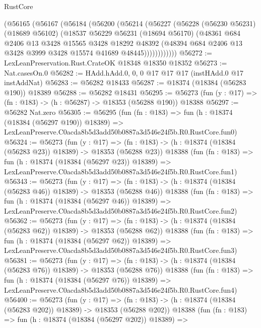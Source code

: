 \begin{lexlean}{RustCore}
\begin{coremodule}
        (@56165
          (@56167
            (@56184
              (@56200
                (@56214
                  (@56227
                    (@56228
                      (@56230 @56231)
                      (@18689 @56102)
                      (@18537
                        @56229
                        @56231
                        (@18694 @56170)
                        (@48361
                          @684
                          @2406
                          @13
                          @3428
                          @15565
                          @3428
                          @18292
                          @48392
                          (@48394 @684 @2406 @13 @3428 @3999 @3428 @15574 @41689 @48445))))))))))))
@56272 := LexLeanPreservation.Rust.CrateOK @18348 @18350 @18352
@56273 := Nat.casesOn.{0}
@56282 := HAdd.hAdd.{0, 0, 0} @17 @17 @17 (instHAdd.{0} @17 instAddNat)
@56283 := @56282 @18433
@56287 := @18374 (@18384 (@56283 @190)) @18389
@56288 := @56282 @18431
@56295 := @56273 (fun (y : @17) => (fn : @183) -> (h : @56287) -> @18353 (@56288 @190)) @18388
@56297 := @56282 Nat.zero
@56305 := @56295
    (fun (fn : @183) =>
    fun (h : @18374 (@18384 (@56297 @190)) @18389) =>
    LexLeanPreserve.C0acda8b5d3add50b0887a3d546e24f5b.R0.RustCore.fun0)
@56324 := @56273
    (fun (y : @17) =>
    (fn : @183) -> (h : @18374 (@18384 (@56283 @23)) @18389) -> @18353 (@56288 @23))
    @18388
    (fun (fn : @183) =>
    fun (h : @18374 (@18384 (@56297 @23)) @18389) =>
    LexLeanPreserve.C0acda8b5d3add50b0887a3d546e24f5b.R0.RustCore.fun1)
@56343 := @56273
    (fun (y : @17) =>
    (fn : @183) -> (h : @18374 (@18384 (@56283 @46)) @18389) -> @18353 (@56288 @46))
    @18388
    (fun (fn : @183) =>
    fun (h : @18374 (@18384 (@56297 @46)) @18389) =>
    LexLeanPreserve.C0acda8b5d3add50b0887a3d546e24f5b.R0.RustCore.fun2)
@56362 := @56273
    (fun (y : @17) =>
    (fn : @183) -> (h : @18374 (@18384 (@56283 @62)) @18389) -> @18353 (@56288 @62))
    @18388
    (fun (fn : @183) =>
    fun (h : @18374 (@18384 (@56297 @62)) @18389) =>
    LexLeanPreserve.C0acda8b5d3add50b0887a3d546e24f5b.R0.RustCore.fun3)
@56381 := @56273
    (fun (y : @17) =>
    (fn : @183) -> (h : @18374 (@18384 (@56283 @76)) @18389) -> @18353 (@56288 @76))
    @18388
    (fun (fn : @183) =>
    fun (h : @18374 (@18384 (@56297 @76)) @18389) =>
    LexLeanPreserve.C0acda8b5d3add50b0887a3d546e24f5b.R0.RustCore.fun4)
@56400 := @56273
    (fun (y : @17) =>
    (fn : @183) -> (h : @18374 (@18384 (@56283 @202)) @18389) -> @18353 (@56288 @202))
    @18388
    (fun (fn : @183) =>
    fun (h : @18374 (@18384 (@56297 @202)) @18389) =>

\end{coremodule}
\end{lexlean}
